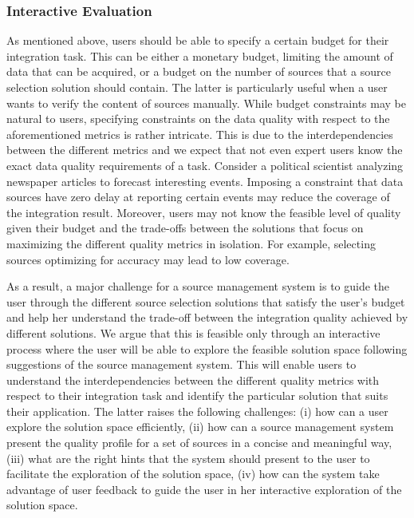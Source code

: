 \documentclass{sig-alternate}
\begin{document}
\subsubsection{Interactive Evaluation}
\label{sec:eval}
As mentioned above, users should be able to specify a certain budget for their integration task. This can be either a monetary budget, limiting the amount of data that can be acquired, or a budget on the number of sources that a source selection solution should contain. The latter is particularly useful when a user wants to verify the content of sources manually. While budget constraints may be natural to users, specifying constraints on the data quality with respect to the aforementioned metrics is rather intricate. This is due to the interdependencies between the different metrics and we expect that not even expert users know the exact data quality requirements of a task. Consider a political scientist analyzing newspaper articles to forecast interesting events. Imposing a constraint that data sources have zero delay at reporting certain events may reduce the coverage of the integration result. Moreover, users may not know the feasible level of quality given their budget and the trade-offs between the solutions that focus on maximizing the different quality metrics in isolation. For example, selecting sources optimizing for accuracy may lead to low coverage.  

As a result, a major challenge for a source management system is to guide the user through the different source selection solutions that satisfy the user's budget and help her understand the trade-off between the integration quality achieved by different solutions. We argue that this is feasible only through an interactive process where the user will be able to explore the feasible solution space following suggestions of the source management system. This will enable users to understand the interdependencies between the different quality metrics with respect to their integration task and identify the particular solution that suits their application. The latter raises the following challenges: (i) how can a user explore the solution space efficiently, (ii) how can a source management system present the quality profile for a set of sources in a concise and meaningful way, (iii) what are the right hints that the system should present to the user to facilitate the exploration of the solution space, (iv) how can the system take advantage of user feedback to guide the user in her interactive exploration of the solution space. 
\end{document}

